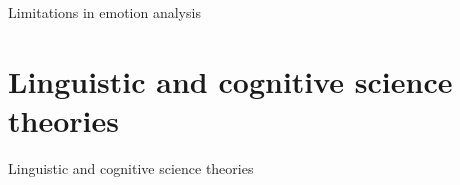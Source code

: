 \documentclass[handout,10pt]{beamer}
\begin{document}
\begin{frame}{Limitations in emotion analysis}


\end{frame}

\section{Linguistic and cognitive science theories}

\begin{frame}{}
\Large
\vfill
\begin{center}
    Linguistic and cognitive science theories
\end{center}
\vfill

\end{frame}
\end{document}
